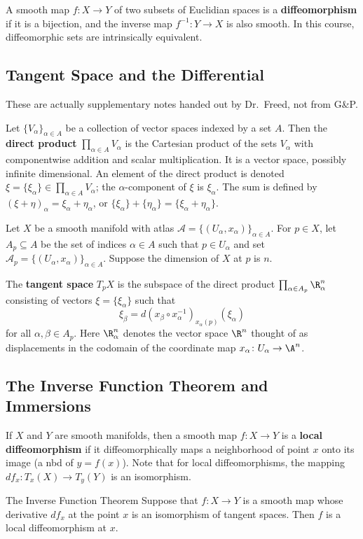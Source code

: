 A smooth map $f \colon X \to Y$ of two subsets of Euclidian spaces is a \textbf{diffeomorphism} if it is a bijection, and the inverse map $f ^{-1} \colon Y \to X$ is also smooth. In this course, diffeomorphic sets are intrinsically equivalent.

\orbreak
\subsection{Tangent Space and the Differential}
These are actually supplementary notes handed out by Dr.\ Freed, not from G\&P.
\begin{definition}
    Let $\{V_{\alpha }\} _{\alpha \in A}$ be a collection of vector spaces indexed by a set $A$. Then the \textbf{direct product} $\prod _{\alpha \in A}V_{\alpha }$ is the Cartesian product of the sets $V_{\alpha }$ with componentwise addition and scalar multiplication. It is a vector space, possibly infinite dimensional. An element of the direct product is denoted $\xi = \{\xi _{\alpha }\} \in  \prod _{\alpha \in A}V_{\alpha }$; the $\alpha $-component of $\xi $ is $\xi _{\alpha }$. The sum is defined by $(\xi + \eta)_{\alpha }=\xi _{\alpha }+\eta _{\alpha }$, or $\{\xi _{\alpha }\} +\{\eta _{\alpha }\} = \{\xi_{\alpha }+\eta _{\alpha }\} $.
\end{definition}
Let $X$ be a smooth manifold with atlas $\mathcal{A} = \{(U_{\alpha },x_{\alpha })\} _{\alpha \in A} $. For $p \in X$, let $A_p\subseteq A$ be the set of indices $\alpha \in A$ such that $p \in U_{\alpha }$ and set $\mathcal{A} _p= \{( U_{\alpha },x _{\alpha })\} _{\alpha \in A}$. Suppose the dimension of $X$ at $p$ is $n$.
\begin{definition}
    The \textbf{tangent space} $T_p X$ is the subspace of the direct product $\prod _{\alpha \in  A_p}\R^n  _{\alpha }$ consisting of vectors $\xi = \{\xi _{\alpha }\} $ such that \[
        \xi _{\beta }= d (x _{\beta }\circ x _{\alpha }^{-1}) _{x _{\alpha }(p)}(\xi _{\alpha })
    \] for all $\alpha ,\beta \in  A_p$. Here $\R^n  _{\alpha }$ denotes the vector space $\R^n $ thought of as displacements in the codomain of the coordinate map $x _{\alpha }\colon  U_{\alpha } \to \A^n $.
\end{definition}

\subsection{The Inverse Function Theorem and Immersions}
If $X$ and $Y$ are smooth manifolds, then a smooth map $f \colon X \to Y$ is a \textbf{local diffeomorphism} if it diffeomorphically maps a neighborhood of point $x$ onto its image (a nbd of $y=f(x)$). Note that for local diffeomorphisms, the mapping $df_x \colon T_x(X) \to T_y(Y)$ is an isomorphism.

\begin{namedthm}{The Inverse Function Theorem}
  Suppose that $f \colon X \to Y$ is a smooth map whose derivative $df_x$ at the point $x$ is an isomorphism of tangent spaces. Then $f$ is a local diffeomorphism at $x$.
\end{namedthm}
